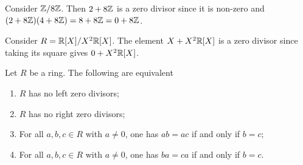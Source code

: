 \begin{example}
  Consider $\mathbb Z/8\mathbb Z$. Then $2+8\mathbb Z$ is a zero divisor since it is non-zero and $(2+8\mathbb Z)(4+8\mathbb Z)=8+8\mathbb Z=0+8\mathbb Z$. 

  Consider $R=\mathbb R[X]/X^2\mathbb R[X]$. The element $X+X^2\mathbb R[X]$ is a zero divisor since taking its square gives $0+X^2\mathbb R[X]$.
\end{example}


\begin{theorem}
  Let $R$ be a ring. The following are equivalent
  \begin{enumerate}
    \item $R$ has no left zero divisors;
    \item $R$ has no right zero divisors;
    \item For all $a,b,c\in R$ with $a\neq 0$, one has $ab=ac$ if and only if $b=c$;
    \item For all $a,b,c\in R$ with $a\neq 0$, one has $ba=ca$ if and only if $b=c$.
  \end{enumerate}
  \label{<+label+>}
\end{theorem}
